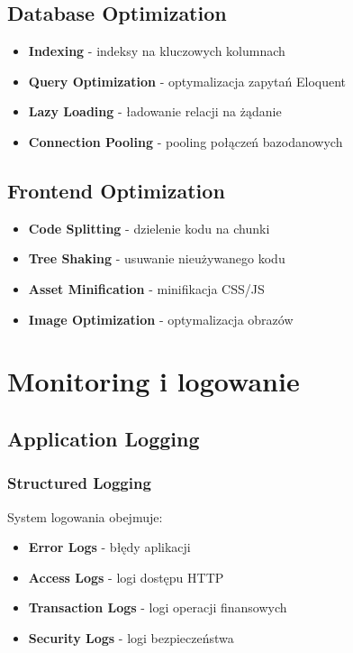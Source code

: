     \subsection{Database Optimization}

    \begin{itemize}
        \item \textbf{Indexing} - indeksy na kluczowych kolumnach
        \item \textbf{Query Optimization} - optymalizacja zapytań Eloquent
        \item \textbf{Lazy Loading} - ładowanie relacji na żądanie
        \item \textbf{Connection Pooling} - pooling połączeń bazodanowych
    \end{itemize}

    \subsection{Frontend Optimization}

    \begin{itemize}
        \item \textbf{Code Splitting} - dzielenie kodu na chunki
        \item \textbf{Tree Shaking} - usuwanie nieużywanego kodu
        \item \textbf{Asset Minification} - minifikacja CSS/JS
        \item \textbf{Image Optimization} - optymalizacja obrazów
    \end{itemize}

    \section{Monitoring i logowanie}

    \subsection{Application Logging}

    \subsubsection{Structured Logging}
    System logowania obejmuje:

    \begin{itemize}
        \item \textbf{Error Logs} - błędy aplikacji
        \item \textbf{Access Logs} - logi dostępu HTTP
        \item \textbf{Transaction Logs} - logi operacji finansowych
        \item \textbf{Security Logs} - logi bezpieczeństwa
    \end{itemize}

